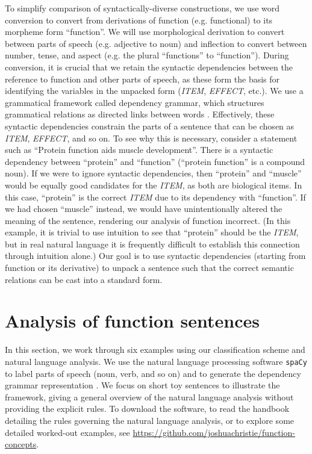 \documentclass{article}
\begin{document}
To simplify comparison of syntactically-diverse constructions, we use word conversion to convert from derivations of function (e.g. functional) to its morpheme form ``function''.
We will use morphological derivation to convert between parts of speech (e.g. adjective to noun) and inflection to convert between number, tense, and aspect (e.g. the plural ``functions'' to ``function'').
During conversion, it is crucial that we retain the syntactic dependencies between the reference to function and other parts of speech, as these form the basis for identifying the variables in the unpacked form (\emph{ITEM}, \emph{EFFECT}, etc.).
We use a grammatical framework called dependency grammar, which structures grammatical relations as directed links between words \cite{demarneffe2019}.
Effectively, these syntactic dependencies constrain the parts of a sentence that can be chosen as \emph{ITEM}, \emph{EFFECT}, and so on.
To see why this is necessary, consider a statement such as ``Protein function aids muscle development''.
There is a syntactic dependency between ``protein'' and ``function'' (``protein function'' is a compound noun).
If we were to ignore syntactic dependencies, then ``protein'' and ``muscle'' would be equally good candidates for the \emph{ITEM}, as both are biological items.
In this case, ``protein'' is the correct \emph{ITEM} due to its dependency with ``function''.
If we had chosen ``muscle'' instead, we would have unintentionally altered the meaning of the sentence, rendering our analysis of function incorrect.
(In this example, it is trivial to use intuition to see that ``protein'' should be the \emph{ITEM}, but in real natural language it is frequently difficult to establish this connection through intuition alone.)
Our goal is to use syntactic dependencies (starting from function or its derivative) to unpack a sentence such that the correct semantic relations can be cast into a standard form.

\section{Analysis of function sentences}
\label{sec:example-sentences}

In this section, we work through six examples using our classification scheme and natural language analysis.
We use the natural language processing software \texttt{spaCy} to label parts of speech (noun, verb, and so on) and to generate the dependency grammar representation \cite{spacy}.
We focus on short toy sentences to illustrate the framework, giving a general overview of the natural language analysis without providing the explicit rules.
To download the software, to read the handbook detailing the rules governing the natural language analysis, or to explore some detailed worked-out examples, see
\newline
\href{https://github.com/joshuachristie/function-concepts}{https://github.com/joshuachristie/function-concepts}.
\end{document}
